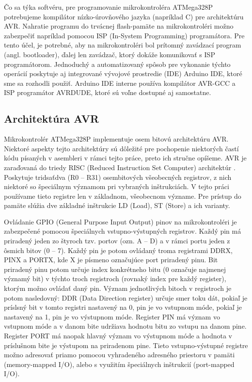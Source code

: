 Čo sa týka softvéru, pre programovanie mikrokontroléra ATMega328P potrebujeme kompilátor nízko-úrovňového jazyka (napríklad C) pre architektúru AVR. Nahratie programu do trvácnej flash-pamäte na mikrokontroléri možno zabezpečiť napríklad pomocou ISP (In-System Programming) programátora. Pre tento účel, je potrebné, aby na mikrokontroléri bol prítomný zavádzací program (angl. bootloader), ďalej len zavádzač, ktorý dokáže komunikovať s ISP programátorom. Jednoduchý a automatizovaný spôsob pre vykonanie týchto operácií poskytuje aj integrované vývojové prostredie (IDE) Arduino IDE, ktoré sme sa rozhodli použiť. Arduino IDE interne používa kompilátor AVR-GCC a ISP programátor AVRDUDE, ktoré sú voľne dostupné aj samostatne.

\subsection{Architektúra AVR}
Mikrokontrolér ATMega328P implementuje osem bitovú architektúru AVR. Niektoré aspekty tejto architektúry sú dôležité pre pochopenie niektorých častí kódu písaných v asembleri v rámci tejto práce, preto ich stručne opíšeme. AVR je zaraďovaná do triedy RISC (Reduced Instruction Set Computer) architektúr \cite{avrInstruction}. Poskytuje tridsaťdva (R0 -- R31) osembitových všeobecných registrov, z nich niektoré so špeciálnym významom pri vybraných inštrukciách. V tejto práci používame tieto registre len v základnom, všeobecnom význame. Pre prístup do pamäte slúžia dve základné inštrukcie LD (Load), ST (Store) a ich varianty. 

Ovládanie GPIO (General Purpose Input Output) pinov na mikrokontroléri je zabezpečené pomocou špeciálnych vstupno-výstupných registrov. Každý pin má priradený jeden zo štyroch tzv. portov (ozn. A -- D) a v rámci portu jeden z ôsmich bitov (0 -- 7). Každý pin je potom ovládaný troma registrami DDRX, PINX a PORTX, kde X je písmeno označujúce port priradený pinu. Bit priradený pinu potom určuje index konkrétneho bitu (0 označuje najmenej významý bit) v týchto troch registroch (rovnaký index pre každý register), ktorým možno ovládať daný pin. Význam jednotlivých bitoch v registroch je potom nasledovný: DDR (Data Direction register) určuje smer toku dát, pokiaľ je príslsný bit v tomto registri nastavený na 0, pin je vo vstupnom móde, pokiaľ je nastavený na 1, pin je vo výstupnom móde. Register PIN má význam vo vstupnom móde a v danom bite udržiava hodnotu bitu zo vstupu na danom pine. Register PORT má naopak hlavný význam vo výstupnom móde a hodnota v príslušnom bite je výstupom na priradenom pine. Tieto vstupno-výstupné registre možno adresovať priamo pomocou vyhradeného adresného priestoru v pamäti (memory-mapped I/O), alebo s využitím špeciálnych inštrukcií (port-mapped I/O).

